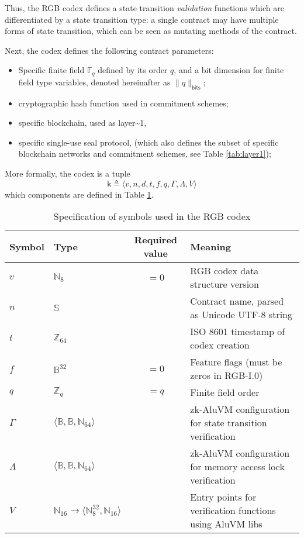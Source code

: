 \documentclass[9pt,oneside]{amsart}
\begin{document}
\begin{multicols}{2}
Thus, the RGB codex defines a state transition \emph{validation} functions
which are differentiated by a state transition type:
a single contract may have multiple forms of state transition,
which can be seen as mutating methods of the contract.

Next, the codex defines the following contract parameters:

\begin{itemize}
\item Specific finite field $\mathbb{F}_q$ defined by its order $q$,
  and a bit dimension for finite field type variables, denoted hereinafter as $\|q\|_\mathsf{bits}$;
\item cryptographic hash function used in commitment schemes;
\item specific blockchain, used as \gls{layer~1},
\item specific single-use seal protocol,
  (which also defines the subset of specific blockchain networks
  and commitment schemes, see Table \ref{tab:layer1});
\end{itemize}

More formally, the codex is a tuple
\noindent
\begin{equation}
\mathsf{k} \triangleq \langle v, n, d, t, f, q, \mathsf{\Gamma}, \mathsf{\Lambda}, V \rangle
\end{equation}
\noindent
which components are defined in Table \ref{tab:codex}.


\end{multicols}
\begin{table}[h]
\centering
\caption{Specification of symbols used in the RGB codex}\label{tab:codex}
\begin{tabular}{ l l c p{8cm} }
\toprule
Symbol & Type & Required value & Meaning \\
\midrule
$v$ & $\mathbb{N}_8$ & $=0$ & RGB codex data structure version \\
$n$ & $\mathbb{S}$ &  & Contract name, parsed as Unicode UTF-8 string \\
$t$ & $\mathbb{Z}_{64}$ &  & ISO 8601 timestamp of codex creation \\
$f$ & $\mathbb{B}^{32}$ & $=0$ & Feature flags (must be zeros in RGB-I.0) \\
$q$ & $\mathbb{Z}_q$ & $=q$ & Finite field order \\
$\mathsf{\Gamma}$ & $\langle \mathbb{B}, \mathbb{B}, \mathbb{N}_{64} \rangle$ &  &  zk-AluVM configuration for state transition verification \\
$\mathsf{\Lambda}$ & $\langle \mathbb{B}, \mathbb{B}, \mathbb{N}_{64} \rangle$ &  & zk-AluVM configuration for memory access lock verification \\
$V$ & $\mathbb{N}_{16} \rightarrow \langle \mathbb{N}_8^{32}, \mathbb{N}_{16} \rangle$ &  & Entry points for verification functions using AluVM libs \\
\bottomrule
\end{tabular}
\end{table}
\end{document}
